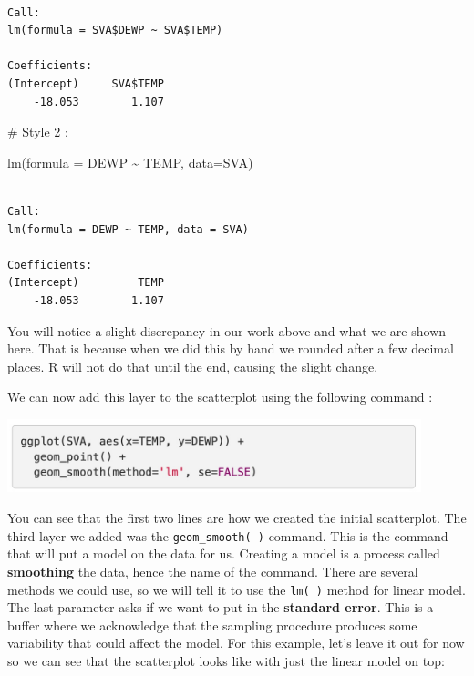 \documentclass[
  letterpaper,
  DIV=11,
  numbers=noendperiod]{scrreprt}
\newenvironment{Shaded}{\begin{snugshade}}{\end{snugshade}}
\newcommand{\AttributeTok}[1]{\textcolor[rgb]{0.40,0.45,0.13}{#1}}
\newcommand{\CommentTok}[1]{\textcolor[rgb]{0.37,0.37,0.37}{#1}}
\newcommand{\FunctionTok}[1]{\textcolor[rgb]{0.28,0.35,0.67}{#1}}
\newcommand{\NormalTok}[1]{\textcolor[rgb]{0.00,0.23,0.31}{#1}}
\newcommand{\SpecialCharTok}[1]{\textcolor[rgb]{0.37,0.37,0.37}{#1}}
\begin{document}
\begin{Shaded}
\end{Shaded}

\begin{verbatim}

Call:
lm(formula = SVA$DEWP ~ SVA$TEMP)

Coefficients:
(Intercept)     SVA$TEMP  
    -18.053        1.107  
\end{verbatim}

\begin{Shaded}
\begin{Highlighting}[]
\CommentTok{\# Style 2 : }

\FunctionTok{lm}\NormalTok{(}\AttributeTok{formula =}\NormalTok{ DEWP }\SpecialCharTok{\textasciitilde{}}\NormalTok{ TEMP, }\AttributeTok{data=}\NormalTok{SVA)}
\end{Highlighting}
\end{Shaded}

\begin{verbatim}

Call:
lm(formula = DEWP ~ TEMP, data = SVA)

Coefficients:
(Intercept)         TEMP  
    -18.053        1.107  
\end{verbatim}

You will notice a slight discrepancy in our work above and what we are
shown here. That is because when we did this by hand we rounded after a
few decimal places. R will not do that until the end, causing the slight
change.

We can now add this layer to the scatterplot using the following command
:

\includegraphics[width=0.9\textwidth,height=\textheight]{./images/LMR_11.jpg}

You can see that the first two lines are how we created the initial
scatterplot. The third layer we added was the \texttt{geom\_smooth(\ )}
command. This is the command that will put a model on the data for us.
Creating a model is a process called \textbf{smoothing} the data, hence
the name of the command. There are several methods we could use, so we
will tell it to use the \texttt{lm(\ )} method for linear model. The
last parameter asks if we want to put in the \textbf{standard error}.
This is a buffer where we acknowledge that the sampling procedure
produces some variability that could affect the model. For this example,
let's leave it out for now so we can see that the scatterplot looks like
with just the linear model on top:
\end{document}
